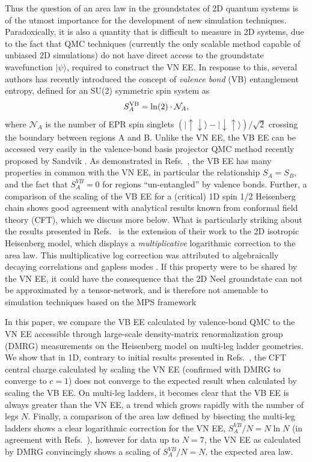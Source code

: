 \documentclass[prl,aps,twocolumn,floatfix,amsmath,amssymb,superscriptaddress,tightenlines]{revtex4}
\begin{document}
Thus the question of an area law in the groundstates of 2D quantum systems
is of the utmost importance for the development of new simulation
techniques.  Paradoxically, it is also a quantity that is difficult to
measure in 2D systems, due to the fact that QMC techniques (currently the
only scalable method capable of unbiased 2D simulations) do not have
direct access to the groundstate wavefunction $| \psi \rangle$, required
to construct the VN EE.  In response to this, several authors \cite{Alet,
Chh} has recently introduced the concept of {\it valence bond} (VB)
entanglement entropy, defined for an SU(2) symmetric spin system as
\begin{equation} S^{\rm VB}_A = \ln(2) \cdot \mathcal{N}_A, \label{VBEE}
\end{equation} where $ \mathcal{N}_A$ is the number of EPR spin singlets
${( |\uparrow \downarrow \rangle - | \downarrow \uparrow
\rangle)/\sqrt{2}}$ crossing the boundary between regions A and B.  Unlike
the VN EE, the VB EE can be accessed very easily in the valence-bond basis
projector QMC method recently proposed by Sandvik \cite{Sandvik}.  As
demonstrated in Refs.~\cite{Alet,Chh}, the VB EE has many properties in
common with the VN EE, in particular the relationship $S_A = S_B$, and the
fact that $S^{VB}_A=0$ for regions ``un-entangled'' by valence bonds.
Further, a comparison of the scaling of the VB EE for a (critical) 1D spin
1/2 Heisenberg chain shows good agreement with analytical results known
from conformal field theory (CFT), which we discuss more below.  What is
particularly striking about the results presented in Refs.~\cite{Alet,Chh}
is the extension of their work to the 2D isotropic Heisenberg model, which
displays a {\it multiplicative} logarithmic correction to the area law.
This multiplicative log correction was attributed to algebraically
decaying correlations \cite{Chh} and gapless modes \cite{Alet}.  If this
property were to be shared by the VN EE, it could have the consequence
that the 2D Neel groundstate can not be approximated by a tensor-network,
and is therefore not amenable to simulation techniques based on the MPS
framework
 
In this paper, we compare the VB EE calculated by valence-bond QMC to the
VN EE accessible through large-scale density-matrix renormalization group
(DMRG) measurements on the Heisenberg model on multi-leg ladder
geometries.    We show that in 1D, contrary to initial results presented
in Refs.~\cite{Alet,Chh}, the CFT central charge calculated by scaling the
VN EE (confirmed with DMRG to converge to $c=1$) does not converge to the
expected result when calculated by scaling the VB EE.  On multi-leg
ladders, it becomes clear that the VB EE is always greater than the VN EE,
a trend which grows rapidly with the number of legs $N$.  Finally, a
comparison of the area law defined by bisecting the multi-leg ladders
shows a clear logarithmic correction for the VN EE, $S^{VB}_A /N = N \ln
N$ (in agreement with Refs.~\cite{Alet,Chh}), however for data up to
$N=7$, the VN EE as calculated by DMRG convincingly shows a scaling of
$S^{VB}_A /N = N$, the expected area law.
\end{document}

